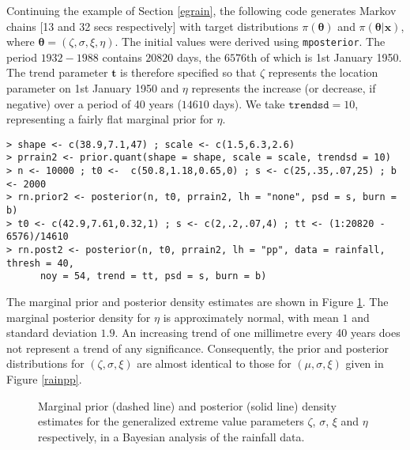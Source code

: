 \documentclass[11pt,a4paper]{article}
\newcommand{\bs}{\boldsymbol}
\begin{document}
Continuing the example of Section \ref{egrain}, the following code generates Markov chains [13 and 32 secs respectively] with target distributions $\pi(\bs{\theta})$ and $\pi(\bs{\theta}|\bs{x})$, where $\bs{\theta} = (\zeta,\sigma,\xi,\eta)$.
The initial values were derived using \verb+mposterior+.
The period $1932-1988$ contains $20820$ days, the $6576$th of which is 1st January 1950. 
The trend parameter $\bs{t}$ is therefore specified so that $\zeta$ represents the location parameter on 1st January 1950 and $\eta$ represents the increase (or decrease, if negative) over a period of 40 years ($14610$ days).
We take $\texttt{trendsd} = 10$, representing a fairly flat marginal prior for $\eta$.

\begin{verbatim}
> shape <- c(38.9,7.1,47) ; scale <- c(1.5,6.3,2.6)
> prrain2 <- prior.quant(shape = shape, scale = scale, trendsd = 10)
> n <- 10000 ; t0 <-  c(50.8,1.18,0.65,0) ; s <- c(25,.35,.07,25) ; b <- 2000
> rn.prior2 <- posterior(n, t0, prrain2, lh = "none", psd = s, burn = b)
> t0 <- c(42.9,7.61,0.32,1) ; s <- c(2,.2,.07,4) ; tt <- (1:20820 - 6576)/14610
> rn.post2 <- posterior(n, t0, prrain2, lh = "pp", data = rainfall, thresh = 40, 
      noy = 54, trend = tt, psd = s, burn = b)
\end{verbatim}

The marginal prior and posterior density estimates are shown in Figure \ref{trdens}.
The marginal posterior density for $\eta$ is approximately normal, with mean $1$ and standard deviation $1.9$.
An increasing trend of one millimetre every 40 years does not represent a trend of any significance.
Consequently, the prior and posterior distributions for $(\zeta,\sigma,\xi)$ are almost identical to those for $(\mu,\sigma,\xi)$ given in Figure \ref{rainpp}.

\begin{figure}
\begin{center}
\vspace{-1.5cm}
\hspace{-0.5cm}
\hspace{-0.5cm}
\hspace{-0.5cm}
\end{center}
\caption{Marginal prior (dashed line) and posterior (solid line) density estimates for the generalized extreme value parameters $\zeta$, $\sigma$, $\xi$ and $\eta$ respectively, in a Bayesian analysis of the rainfall data.}
\label{trdens}
\end{figure}
\end{document}
